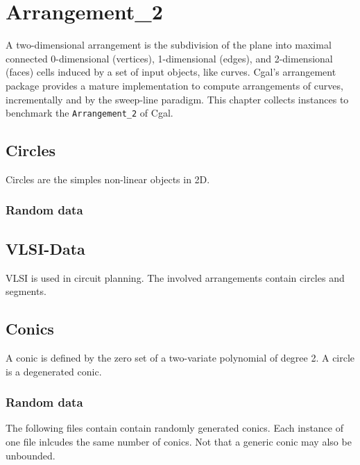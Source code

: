 \chapter{Arrangement\_2\label{bi_cha:Arrangement2}}

A two-dimensional arrangement is the subdivision of the plane into
maximal connected 0-dimensional (vertices), 1-dimensional (edges), 
and 2-dimensional (faces) cells induced by a set of input objects, like
curves. {\sc Cgal}'s arrangement package provides a mature implementation
to compute arrangements of curves, incrementally and by the sweep-line
paradigm. This chapter collects instances to benchmark the 
{\tt Arrangement\_2} of {\sc Cgal}.

\section{Circles\label{bi_sec:Arrangement2Circles}}

Circles are the simples non-linear objects in 2D. 

\subsection{Random data\label{bi_sec:Arrangement2CirclesRandomdata}}


\section{VLSI-Data\label{bi_sec:Arrangement2VLSI}}

VLSI is used in circuit planning. The involved arrangements contain
circles and segments.

\section{Conics\label{bi_sec:Arrangement2Conics}}

A conic is defined by the zero set of a two-variate polynomial
of degree 2. A circle is a degenerated conic.

\subsection{Random data\label{bi_sec:Arrangement2ConicsRandomdata}}

The following files contain contain randomly generated conics. 
Each instance of one file inlcudes the same number of conics. Not that
a generic conic may also be unbounded.

